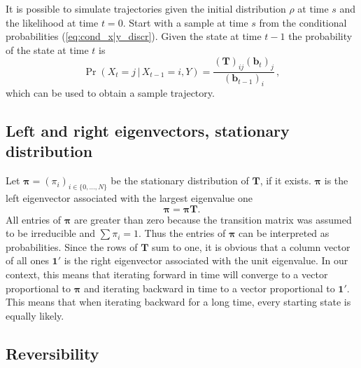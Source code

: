 \documentclass[preprint]{elsarticle}
\newcommand{\bs}[1]{\ensuremath{\boldsymbol{#1}}}
\newcommand\given{{\,|\,}}
\newcommand\x[1]{\ensuremath{X_{#1}}}
\newcommand\y{\ensuremath{Y}}
\newcommand\s{\ensuremath{s}}
\newcommand\oneC{\ensuremath{\mathbf{1}'}}
\newcommand\oneR{\ensuremath{\mathbf{1}}}
\begin{document}
It is possible to simulate trajectories given the initial distribution $\rho$ at time $\s$ and the likelihood at time $t=0$. Start with a sample at time $\s$ from the conditional probabilities (\ref{eq:cond_x|y_discr}). Given the state at time $t-1$ the probability of the state at time $t$ is
\begin{equation}
    \Pr(\x{t}=j\given \x{t-1}=i,\y)=\frac{(\mathbf{T})_{ij}(\mathbf{b}_{t})_j}{(\mathbf{b}_{t-1})_i}\,,
\end{equation}
which can be used to obtain a sample trajectory. 

\subsection{Left and right eigenvectors, stationary distribution}

Let $\bs{\pi} = (\pi_i)_{i \in \{0,\ldots,N\}}$ be the stationary distribution of $\mathbf{T}$, if it exists. $\bs{\pi}$ is the left eigenvector associated with the largest eigenvalue one~\citep[][p. 87]{Ewen04}
\begin{equation}\label{eq:stationary}
\bs{\pi}=\bs{\pi}\mathbf{T}.
\end{equation}
All entries of $\bs{\pi}$ are greater than zero because the transition matrix was assumed to be irreducible and $\sum \pi_i = 1$. Thus the entries of $\bs{\pi}$ can be interpreted as probabilities. Since the rows of $\mathbf{T}$ sum to one, it is obvious that a column vector of all ones $\oneC$ is the right eigenvector associated with the unit eigenvalue. In our context, this means that iterating forward in time will converge to a vector proportional to $\bs{\pi}$ and iterating backward in time to a vector proportional to $\oneC$. %
This means that when iterating backward for a long time, every starting state is equally likely.

\subsection{Reversibility}
\end{document}

